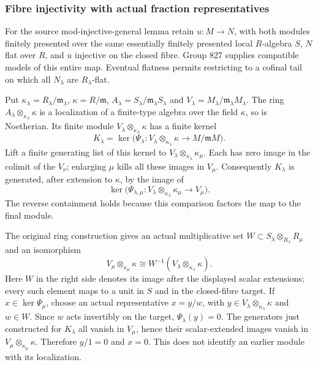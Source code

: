 \subsubsection{Fibre injectivity with actual fraction representatives}\label{fibre-injectivity-with-actual-fraction-representatives}

For the source mod-injective-general lemma retain \(u:M\to N\), with both modules finitely presented over the same essentially finitely presented local \(R\)-algebra \(S\), \(N\) flat over \(R\), and \(\overline u\) injective on the closed fibre. Group 827 supplies compatible models of this entire map. Eventual flatness permits restricting to a cofinal tail on which all \(N_\lambda\) are \(R_\lambda\)-flat.

Put \(\kappa_\lambda=R_\lambda/\mathfrak m_\lambda\), \(\kappa=R/\mathfrak m\), \(A_\lambda=S_\lambda/\mathfrak m_\lambda S_\lambda\) and \(V_\lambda=M_\lambda/\mathfrak m_\lambda M_\lambda\). The ring \(A_\lambda\otimes_{\kappa_\lambda}\kappa\) is a localization of a finite-type algebra over the field \(\kappa\), so is Noetherian. Its finite module \(V_\lambda\otimes_{\kappa_\lambda}\kappa\) has a finite kernel \[
K_\lambda=\ker\bigl(\Psi_\lambda:
 V_\lambda\otimes_{\kappa_\lambda}\kappa\longrightarrow M/\mathfrak mM\bigr).
\] Lift a finite generating list of this kernel to \(V_\lambda\otimes_{\kappa_\lambda}\kappa_\mu\). Each has zero image in the colimit of the \(V_\nu\); enlarging \(\mu\) kills all these images in \(V_\mu\). Consequently \(K_\lambda\) is generated, after extension to \(\kappa\), by the image of \[
\ker\bigl(\Psi_{\lambda,\mu}:
 V_\lambda\otimes_{\kappa_\lambda}\kappa_\mu\longrightarrow V_\mu\bigr).
\] The reverse containment holds because this comparison factors the map to the final module.

The original ring construction gives an actual multiplicative set \(W\subset S_\lambda\otimes_{R_\lambda}R_\mu\) and an isomorphism \[
V_\mu\otimes_{\kappa_\mu}\kappa
 \cong W^{-1}(V_\lambda\otimes_{\kappa_\lambda}\kappa).
\] Here \(W\) in the right side denotes its image after the displayed scalar extensions; every such element maps to a unit in \(S\) and in the closed-fibre target. If \(x\in\ker\Psi_\mu\), choose an actual representative \(x=y/w\), with \(y\in V_\lambda\otimes_{\kappa_\lambda}\kappa\) and \(w\in W\). Since \(w\) acts invertibly on the target, \(\Psi_\lambda(y)=0\). The generators just constructed for \(K_\lambda\) all vanish in \(V_\mu\), hence their scalar-extended images vanish in \(V_\mu\otimes_{\kappa_\mu}\kappa\). Therefore \(y/1=0\) and \(x=0\). This does not identify an earlier module with its localization.

